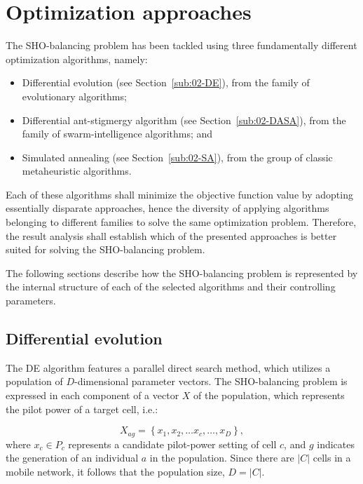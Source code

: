 \section{Optimization approaches \label{sec:07-Optimization_algorithms}}

The SHO-balancing problem has been tackled using three fundamentally
different optimization algorithms, namely:
\begin{itemize}
\item Differential evolution (see Section~\ref{sub:02-DE}), from the family
of evolutionary algorithms;
\item Differential ant-stigmergy algorithm (see Section~\ref{sub:02-DASA}),
from the family of swarm-intelligence algorithms; and
\item Simulated annealing (see Section~\ref{sub:02-SA}), from the group
of classic metaheuristic algorithms.
\end{itemize}
Each of these algorithms shall minimize the objective function value
by adopting essentially disparate approaches, hence the diversity
of applying algorithms belonging to different families to solve the
same optimization problem. Therefore, the result analysis shall establish
which of the presented approaches is better suited for solving the
SHO-balancing problem.

The following sections describe how the SHO-balancing problem is represented
by the internal structure of each of the selected algorithms and their
controlling parameters.


\subsection{Differential evolution}

The DE algorithm features a parallel direct search method, which utilizes
a population of $D$-dimensional parameter vectors. The SHO-balancing
problem is expressed in each component of a vector $X$ of the population,
which represents the pilot power of a target cell, i.e.:

\begin{equation}
X_{ag}=\left\{ x_{1},x_{2},\ldots x_{c},\ldots,x_{D}\right\} ,\label{eq:07-DE_mapping}
\end{equation}
where $x_{c}\in P_{c}$ represents a candidate pilot-power setting
of cell $c$, and $g$ indicates the generation of an individual $a$
in the population. Since there are $|C|$ cells in a mobile network,
it follows that the population size, $D=|C|$.

